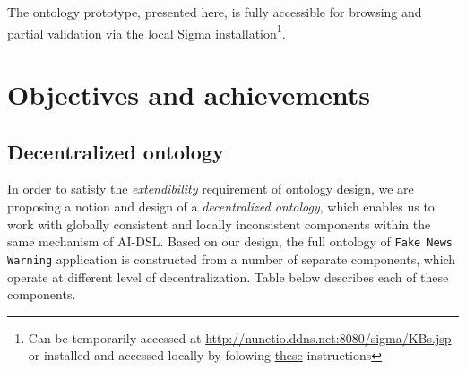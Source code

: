 \documentclass[]{report}
\begin{document}
The ontology prototype, presented here, is fully accessible for browsing and
partial validation via the local Sigma installation\footnote{Can be temporarily
accessed at \href{http://nunetio.ddns.net:8080/sigma/KBs.jsp}
{http://nunetio.ddns.net:8080/sigma/KBs.jsp} or installed and accessed locally
by folowing \href{https://github.com/nunet-io/ai-dsl/blob/master/ontology/tools/README.md}{these} instructions}.

\section{Objectives and achievements}

\subsection{Decentralized ontology}

In order to satisfy the \textit{extendibility} requirement of ontology design,
we are proposing a notion and design of a \textit{decentralized ontology}, which
enables us to work with globally consistent and locally inconsistent components
within the same mechanism of AI-DSL. Based on our design, the full ontology of
\texttt{Fake News Warning} application is constructed from a number of separate
components, which operate at different level of decentralization. Table below
describes each of these components.
\end{document}
